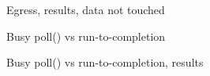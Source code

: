 \documentclass[aspectratio=169]{beamer}
\begin{document}
  \begin{frame}{Egress, results, data not touched}
    \centering{}
  \end{frame}
  \begin{frame}{Busy poll() vs run-to-completion}
    \centering\resizebox{!}{0.9\textheight}{}
  \end{frame}
  \begin{frame}{Busy poll() vs run-to-completion, results}
    \centering{}
  \end{frame}
\end{document}
